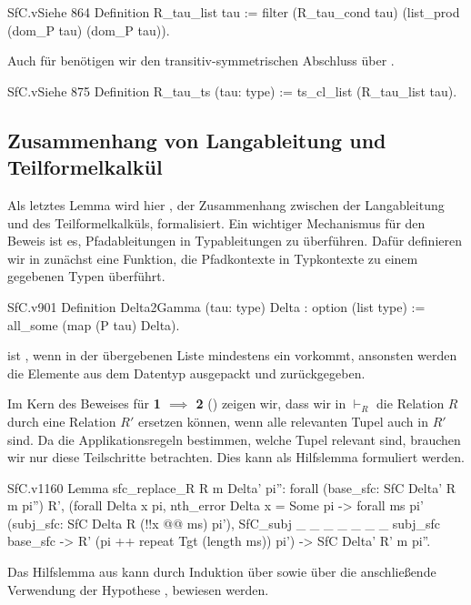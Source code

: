 \begin{code}{SfC.v}{Siehe }{864}
Definition R_tau_list tau :=
    filter (R_tau_cond tau)
      (list_prod (dom_P tau) (dom_P tau)).
\end{code}

Auch für  benötigen wir den transitiv-symmetrischen Abschluss über .

\begin{code}[R_tau_ts]{SfC.v}{Siehe }{875}
Definition R_tau_ts (tau: type) := ts_cl_list (R_tau_list tau).
\end{code}

\subsection{Zusammenhang von Langableitung und Teilformelkalkül}

Als letztes Lemma wird hier , der Zusammenhang zwischen der Langableitung und des Teilformelkalküls, formalisiert. Ein wichtiger Mechanismus für den Beweis ist es, Pfadableitungen in Typableitungen zu überführen. Dafür definieren wir in  zunächst eine Funktion, die Pfadkontexte in Typkontexte zu einem gegebenen Typen überführt.

\begin{code}{SfC.v}{}{901}
Definition Delta2Gamma (tau: type) Delta : option (list type) :=
    all_some (map (P tau) Delta).    
\end{code}
\begin{remark}
     ist , wenn in der übergebenen Liste mindestens ein  vorkommt, ansonsten werden die Elemente aus dem  Datentyp ausgepackt und zurückgegeben.
\end{remark}

Im Kern des Beweises für \textbf{1 $\implies$ 2} () zeigen wir, dass wir in $\vdash_R$ die Relation $R$ durch eine Relation $R'$ ersetzen können, wenn alle relevanten Tupel auch in $R'$ sind. Da die Applikationsregeln bestimmen, welche Tupel relevant sind, brauchen wir nur diese Teilschritte betrachten. Dies kann als Hilfslemma formuliert werden. 

\begin{code}{SfC.v}{}{1160}
Lemma sfc_replace_R {R m Delta' pi''}: 
    forall (base_sfc: SfC Delta' R m pi'') R',
        (forall Delta x pi, nth_error Delta x = Some pi -> 
          forall ms pi' (subj_sfc: SfC Delta R (!!x @@ ms) pi'), 
      SfC_subj _ _ _ _ _ _ _ subj_sfc base_sfc -> 
        R' (pi ++ repeat Tgt (length ms)) pi') -> 
          SfC Delta' R' m pi''.
\end{code}
Das Hilfslemma aus  kann durch Induktion über  sowie über die anschließende Verwendung der Hypothese , bewiesen werden. 

